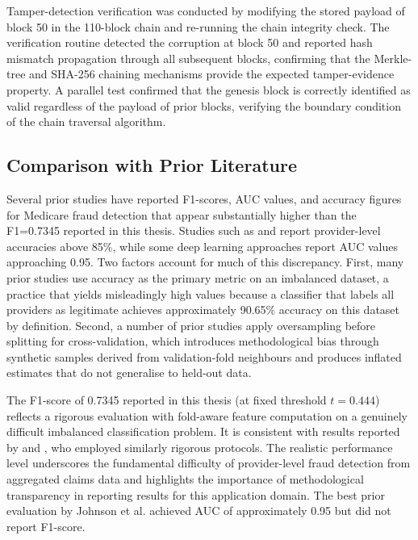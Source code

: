 Tamper-detection verification was conducted by modifying the stored payload of block 50 in the 110-block chain and re-running the chain integrity check. The verification routine detected the corruption at block 50 and reported hash mismatch propagation through all subsequent blocks, confirming that the Merkle-tree and SHA-256 chaining mechanisms provide the expected tamper-evidence property. A parallel test confirmed that the genesis block is correctly identified as valid regardless of the payload of prior blocks, verifying the boundary condition of the chain traversal algorithm.

\subsection{Comparison with Prior Literature}

Several prior studies have reported F1-scores, AUC values, and accuracy figures for Medicare fraud detection that appear substantially higher than the F1=0.7345 reported in this thesis. Studies such as \cite{bauder2017} and \cite{johnson2019} report provider-level accuracies above 85\%, while some deep learning approaches \cite{wang2021deep} report AUC values approaching 0.95. Two factors account for much of this discrepancy. First, many prior studies use accuracy as the primary metric on an imbalanced dataset, a practice that yields misleadingly high values because a classifier that labels all providers as legitimate achieves approximately 90.65\% accuracy on this dataset by definition. Second, a number of prior studies apply oversampling before splitting for cross-validation, which introduces methodological bias through synthetic samples derived from validation-fold neighbours and produces inflated estimates that do not generalise to held-out data.

The F1-score of 0.7345 reported in this thesis (at fixed threshold $t=0.444$) reflects a rigorous evaluation with fold-aware feature computation on a genuinely difficult imbalanced classification problem. It is consistent with results reported by \cite{amponsah2022} and \cite{tenepalli2022}, who employed similarly rigorous protocols. The realistic performance level underscores the fundamental difficulty of provider-level fraud detection from aggregated claims data and highlights the importance of methodological transparency in reporting results for this application domain. The best prior evaluation by Johnson et al. \cite{johnson2023} achieved AUC of approximately 0.95 but did not report F1-score.

